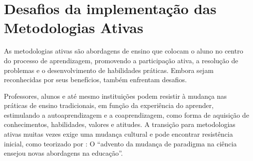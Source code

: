 \section{Desafios da implementação das Metodologias Ativas}

As metodologias ativas são abordagens de ensino que colocam o aluno no centro do processo de aprendizagem, promovendo a participação ativa, a resolução de problemas e o desenvolvimento de habilidades práticas. Embora sejam reconhecidas por seus benefícios, também enfrentam desafios.

Professores, alunos e até mesmo instituições podem resistir à mudança nas práticas de ensino tradicionais, em função da experiência do aprender, estimulando a autoaprendizagem e a coaprendizagem, como forma de aquisição de conhecimentos, habilidades, valores e atitudes.  A transição para metodologias ativas muitas vezes exige uma mudança cultural e pode encontrar resistência inicial, como teorizado por : O ``advento da mudança de paradigma na ciência ensejou novas abordagens na educação''.

